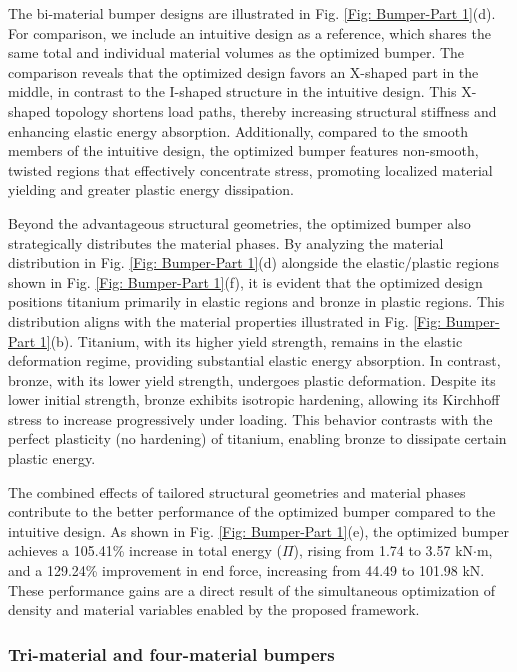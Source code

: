 \documentclass[preprint,11pt]{elsarticle}
\theoremstyle{definition}
\begin{document}
The bi-material bumper designs are illustrated in Fig. \ref{Fig: Bumper-Part 1}(d). For comparison, we include an intuitive design as a reference, which shares the same total and individual material volumes as the optimized bumper. The comparison reveals that the optimized design favors an X-shaped part in the middle, in contrast to the I-shaped structure in the intuitive design. This X-shaped topology shortens load paths, thereby increasing structural stiffness and enhancing elastic energy absorption. Additionally, compared to the smooth members of the intuitive design, the optimized bumper features non-smooth, twisted regions that effectively concentrate stress, promoting localized material yielding and greater plastic energy dissipation.

Beyond the advantageous structural geometries, the optimized bumper also strategically distributes the material phases. By analyzing the material distribution in Fig. \ref{Fig: Bumper-Part 1}(d) alongside the elastic/plastic regions shown in Fig. \ref{Fig: Bumper-Part 1}(f), it is evident that the optimized design positions titanium primarily in elastic regions and bronze in plastic regions. This distribution aligns with the material properties illustrated in Fig. \ref{Fig: Bumper-Part 1}(b). Titanium, with its higher yield strength, remains in the elastic deformation regime, providing substantial elastic energy absorption. In contrast, bronze, with its lower yield strength, undergoes plastic deformation. Despite its lower initial strength, bronze exhibits isotropic hardening, allowing its Kirchhoff stress to increase progressively under loading. This behavior contrasts with the perfect plasticity (no hardening) of titanium, enabling bronze to dissipate certain plastic energy.

The combined effects of tailored structural geometries and material phases contribute to the better performance of the optimized bumper compared to the intuitive design. As shown in Fig. \ref{Fig: Bumper-Part 1}(e), the optimized bumper achieves a 105.41\% increase in total energy ($\Pi$), rising from 1.74 to 3.57 kN$\cdot$m, and a 129.24\% improvement in end force, increasing from 44.49 to 101.98 kN. These performance gains are a direct result of the simultaneous optimization of density and material variables enabled by the proposed framework.

\subsubsection{Tri-material and four-material bumpers}
\end{document}
